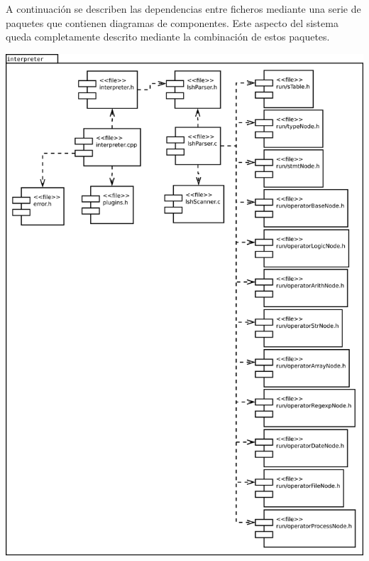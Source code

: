 A continuación se describen las dependencias entre ficheros mediante una serie de paquetes que contienen diagramas de componentes.
Este aspecto del sistema queda completamente descrito mediante la combinación de estos paquetes.

\begin{center}
\includegraphics[scale=0.3]{files_arquitecture/interpreter.png} \\
\end{center}
\pagebreak
